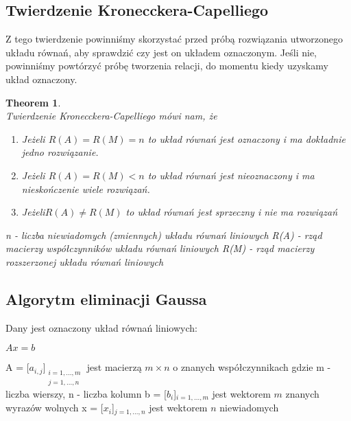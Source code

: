 \documentclass{article}
\newtheorem{theorem}{Theorem}
\begin{document}
\newpage

\subsection{Twierdzenie Kronecckera-Capelliego}\label{tw KC}

Z tego twierdzenie powinniśmy skorzystać przed próbą rozwiązania utworzonego układu równań, aby sprawdzić czy jest on układem oznaczonym. Jeśli nie, powinniśmy powtórzyć próbę tworzenia relacji, do momentu kiedy uzyskamy układ oznaczony.

\begin{theorem}
\\
Twierdzenie Kronecckera-Capelliego mówi nam, że

\begin{enumerate}
    \item Jeżeli \begin{math}    R(A) = R(M) = n \end{math} to układ równań jest oznaczony i ma dokładnie jedno rozwiązanie.
    \item Jeżeli  \begin{math} R(A) = R(M) < n \end{math} to układ równań jest nieoznaczony i ma nieskończenie wiele rozwiązań.
    \item Jeżeli\begin{math} R(A) \neq R(M) \end{math} to układ równań jest  sprzeczny i nie ma rozwiązań
\end{enumerate}
n - liczba niewiadomych (zmiennych) układu równań liniowych
\newline
R(A) - rząd macierzy współczynników układu równań liniowych
\newline
R(M) - rząd macierzy rozszerzonej układu równań liniowych 
\end{theorem}

\subsection{Algorytm eliminacji Gaussa}

\large{Dany jest oznaczony układ równań liniowych:
\begin{center}
    $Ax = b$
\end{center}
A = [$a_{i,j}$]$_\substack{{i=1,...,m}\\{j=1,...,n}}$ jest macierzą $m \times n$ o znanych współczynnikach gdzie m - liczba wierszy, n - liczba kolumn\newline
b = [$b_{i}$]$_{i=1,...,m}$ jest wektorem $m$ znanych wyrazów wolnych \newline
x = [$x_{i}$]$_{j=1,...,n}$ jest wektorem $n$ niewiadomych
}
\end{document}
